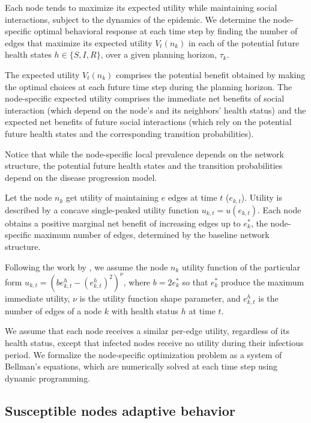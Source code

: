 \documentclass[9pt,twocolumn,twoside]{pnas-new}
\begin{document}
Each node tends to maximize its expected utility while maintaining social interactions, subject to the dynamics of the epidemic. We determine the node-specific optimal behavioral response at each time step by finding the number of edges that maximize its expected utility $V_t(n_k)$ in each of the potential future health states $h\in \{S,I,R\}$, over a given planning horizon, $\tau_k$.

The expected utility $V_t(n_k)$ comprises the potential benefit obtained by making the optimal choices at each future time step during the planning horizon. The node-specific expected utility comprises the immediate net benefits of social interaction (which depend on the node's and its neighbors' health status) and the expected net benefits of future social interactions (which rely on the potential future health states and the corresponding transition probabilities).

Notice that while the node-specific local prevalence depends on the network structure, the potential future health states and the transition probabilities depend on the disease progression model.


Let the node $n_k$ get utility of maintaining $e$ edges at time $t$ ($e_{k,t}$). Utility is described by a concave single-peaked utility function $u_{k,t}=u(e_{k,t})$. Each node obtains a positive marginal net benefit of increasing edges up to $e_k^*$, the node-specific maximum number of edges, determined by the baseline network structure.

Following the work by \cite{morin2013sir}, we assume the node $n_k$ utility function of the particular form $u_{k,t}=\left(b e_{k,t}^{h}-(e_{k,t}^{h})^ 2\right)^{\nu}$, where $b=2 e_k^*$ so that $e_k^*$ produce the maximum immediate utility, $\nu$ is the utility function shape parameter, and $e_{k,t}^{h}$ is the number of edges of a node $k$ with health status $h$ at time $t$.

We assume that each node receives a similar per-edge utility, regardless of its health status, except that infected nodes receive no utility during their infectious period. We formalize the node-specific optimization problem as a system of Bellman's equations, which are numerically solved at each time step using dynamic programming.

\subsection*{Susceptible nodes adaptive behavior}
\end{document}

